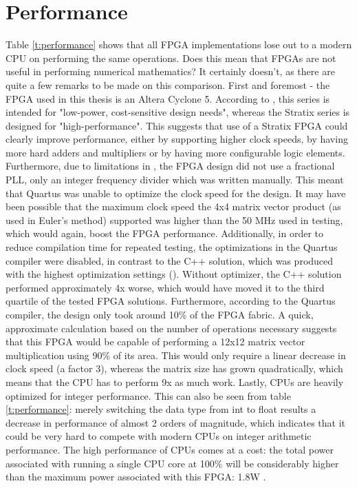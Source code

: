 \section{Performance}
Table \ref{t:performance} shows that all FPGA implementations lose out to a modern CPU on performing the same operations. Does this mean that FPGAs are not useful in performing numerical mathematics? It certainly doesn't, as there are quite a few remarks to be made on this comparison. First and foremost - the FPGA used in this thesis is an Altera Cyclone 5. According to \cite{AlteraFPGAs}, this series is intended for "low-power, cost-sensitive design needs", whereas the Stratix series is designed for "high-performance". This suggests that use of a Stratix FPGA could clearly improve performance, either by supporting higher clock speeds, by having more hard adders and multipliers or by having more configurable logic elements. Furthermore, due to limitations in \clash{}, the FPGA design did not use a fractional PLL, only an integer frequency divider which was written manually. This meant that Quartus was unable to optimize the clock speed for the design. It may have been possible that the maximum clock speed the 4x4 matrix vector product (as used in Euler's method) supported was higher than the 50 MHz used in testing, which would again, boost the FPGA performance. Additionally, in order to reduce compilation time for repeated testing, the optimizations in the Quartus compiler were disabled, in contrast to the C++ solution, which was produced with the highest optimization settings (). Without optimizer, the C++ solution performed approximately 4x worse, which would have moved it to the third quartile of the tested FPGA solutions. Furthermore, according to the Quartus compiler, the design only took around 10\% of the FPGA fabric. A quick, approximate calculation based on the number of operations necessary suggests that this FPGA would be capable of performing a 12x12 matrix vector multiplication using 90\% of its area. This would only require a linear decrease in clock speed (a factor 3), whereas the matrix size has grown quadratically, which means that the CPU has to perform 9x as much work. Lastly, CPUs are heavily optimized for integer performance. This can also be seen from table \ref{t:performance}: merely switching the data type from int to float results a decrease in performance of almost 2 orders of magnitude, which indicates that it could be very hard to compete with modern CPUs on integer arithmetic performance. The high performance of CPUs comes at a cost: the total power associated with running a single CPU core at 100\% will be considerably higher \cite{Inteli7} than the maximum power associated with this FPGA: 1.8W \cite{AlteraCycloneV}.

